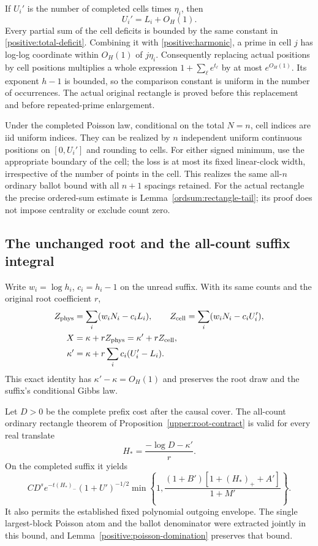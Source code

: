 If $U_i'$ is the number of completed cells times $\eta_i$, then
\begin{equation}
 U_i'=L_i+O_H(1).
 \label{positive:budget}
\end{equation}
Every partial sum of the cell deficits is bounded by the same constant
in \eqref{positive:total-deficit}. Combining it with
\eqref{positive:harmonic}, a prime in cell $j$ has log-log coordinate
within $O_H(1)$ of $j\eta_i$. Consequently replacing actual positions by
cell positions multiplies a whole expression
$1+\sum_\ell e^{t_\ell}$ by at most $e^{O_H(1)}$.
Its exponent $h-1$ is bounded, so the comparison constant is uniform
in the number of occurrences. The actual original rectangle is proved before
this replacement and before repeated-prime enlargement.

Under the completed Poisson law, conditional on the total $N=n$, cell
indices are iid uniform indices. They can be realized by $n$ independent
uniform continuous positions on $[0,U_i']$ and rounding to cells.
For either signed minimum, use the appropriate boundary of the cell;
the loss is at most its fixed linear-clock width, irrespective of the
number of points in the cell. This realizes the same all-$n$ ordinary
ballot bound with all $n+1$ spacings retained. For the actual rectangle
the precise ordered-sum estimate is Lemma~\ref{ordsum:rectangle-tail};
its proof does not impose centrality or exclude count zero.

\subsection{The unchanged root and the all-count suffix integral}
Write $w_i=\log h_i$, $c_i=h_i-1$ on the unread suffix. With its same
counts and the original root coefficient $r$,
\begin{align}
 Z_{\rm phys}&=\sum_i(w_iN_i-c_iL_i),
 \qquad Z_{\rm cell}=\sum_i(w_iN_i-c_iU_i'),\notag\\
 X&=\kappa+rZ_{\rm phys}=\kappa'+rZ_{\rm cell},\notag\\
 \kappa'&=\kappa+r\sum_i c_i(U_i'-L_i).
 \label{positive:exact-root}
\end{align}
This exact identity has $\kappa'-\kappa=O_H(1)$ and preserves the
root draw and the suffix's conditional Gibbs law.

Let $D>0$ be the complete prefix cost after the causal cover. The
all-count ordinary rectangle theorem of
Proposition~\ref{upper:root-contract} is valid for every real translate
\[
 H_*=\frac{-\log D-\kappa'}r.
\]
On the completed suffix it yields
\begin{equation}
 C D^s e^{-t(H_*)_-}(1+U')^{-1/2}
 \min\left\{1,
   \frac{(1+B')[1+(H_*)_++A']}{1+M'}\right\}.
 \label{positive:root-upper}
\end{equation}
It also permits the established fixed polynomial outgoing envelope.
The single largest-block Poisson atom and the ballot denominator were
extracted jointly in this bound, and
Lemma~\ref{positive:poisson-domination} preserves that bound.

